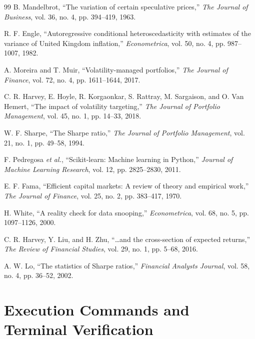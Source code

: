 \documentclass[11pt, a4paper]{article}
\begin{document}
\begin{thebibliography}{99}
 B. Mandelbrot, ``The variation of certain speculative prices,'' \textit{The Journal of Business}, vol. 36, no. 4, pp. 394--419, 1963.

 R. F. Engle, ``Autoregressive conditional heteroscedasticity with estimates of the variance of United Kingdom inflation,'' \textit{Econometrica}, vol. 50, no. 4, pp. 987--1007, 1982.

 A. Moreira and T. Muir, ``Volatility-managed portfolios,'' \textit{The Journal of Finance}, vol. 72, no. 4, pp. 1611--1644, 2017.

 C. R. Harvey, E. Hoyle, R. Korgaonkar, S. Rattray, M. Sargaison, and O. Van Hemert, ``The impact of volatility targeting,'' \textit{The Journal of Portfolio Management}, vol. 45, no. 1, pp. 14--33, 2018.

 W. F. Sharpe, ``The Sharpe ratio,'' \textit{The Journal of Portfolio Management}, vol. 21, no. 1, pp. 49--58, 1994.

 F. Pedregosa \textit{et al.}, ``Scikit-learn: Machine learning in Python,'' \textit{Journal of Machine Learning Research}, vol. 12, pp. 2825--2830, 2011.

 E. F. Fama, ``Efficient capital markets: A review of theory and empirical work,'' \textit{The Journal of Finance}, vol. 25, no. 2, pp. 383--417, 1970.

 H. White, ``A reality check for data snooping,'' \textit{Econometrica}, vol. 68, no. 5, pp. 1097--1126, 2000.

 C. R. Harvey, Y. Liu, and H. Zhu, ``\dots and the cross-section of expected returns,'' \textit{The Review of Financial Studies}, vol. 29, no. 1, pp. 5--68, 2016.

 A. W. Lo, ``The statistics of Sharpe ratios,'' \textit{Financial Analysts Journal}, vol. 58, no. 4, pp. 36--52, 2002.

\end{thebibliography}

\newpage
\appendix
\section{Execution Commands and Terminal Verification}
\label{app:run}
\end{document}
